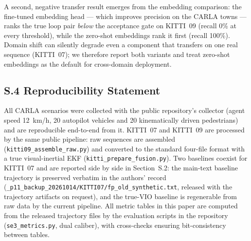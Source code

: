 A second, negative transfer result emerges from the embedding comparison: the fine-tuned embedding head --- which improves precision on the CARLA towns --- ranks the true loop pair \emph{below} the acceptance gate on KITTI~09 (recall 0\% at every threshold), while the zero-shot embeddings rank it first (recall 100\%). Domain shift can silently degrade even a component that transfers on one real sequence (KITTI~07); we therefore report both variants and treat zero-shot embeddings as the default for cross-domain deployment.

\subsection*{S.4 Reproducibility Statement}

All CARLA scenarios were collected with the public repository's collector (agent speed 12~km/h, 20 autopilot vehicles and 20 kinematically driven pedestrians) and are reproducible end-to-end from it. KITTI~07 and KITTI~09 are processed by the same public pipeline: raw sequences are assembled (\texttt{kitti09\_assemble\_raw.py}) and converted to the standard four-file format with a true visual-inertial EKF (\texttt{kitti\_prepare\_fusion.py}). Two baselines coexist for KITTI~07 and are reported side by side in Section~S.2: the main-text baseline trajectory is preserved verbatim in the authors' record (\texttt{\_p11\_backup\_20261014/KITTI07/fp\_old\_synthetic.txt}, released with the trajectory artifacts on request), and the true-VIO baseline is regenerable from raw data by the current pipeline. All metric tables in this paper are computed from the released trajectory files by the evaluation scripts in the repository (\texttt{se3\_metrics.py}, dual caliber), with cross-checks ensuring bit-consistency between tables.
